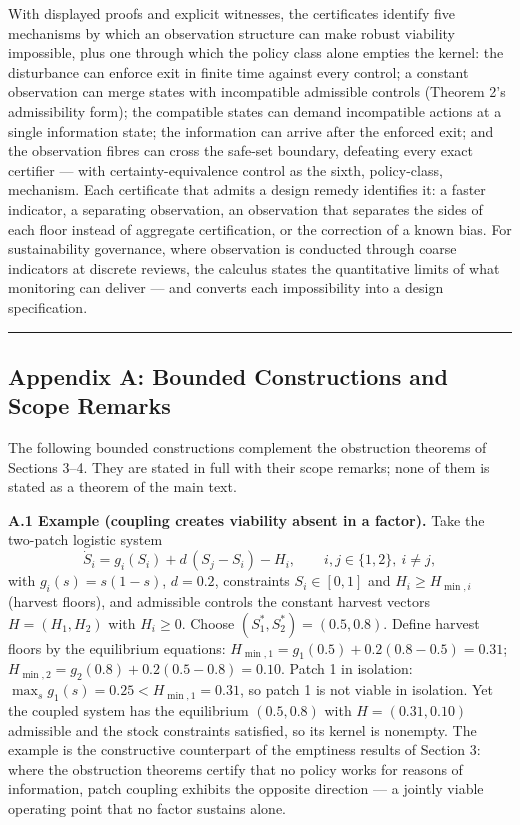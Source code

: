\documentclass[11pt]{article}
\begin{document}
With displayed proofs and explicit witnesses, the certificates identify
five mechanisms by which an observation structure can make robust
viability impossible, plus one through which the policy class alone
empties the kernel: the disturbance can enforce exit in finite time
against every control; a constant observation can merge states with
incompatible admissible controls (Theorem 2's admissibility form);
the compatible states can demand incompatible actions at a single
information state; the information can arrive after the enforced exit;
and the observation fibres can cross the safe-set boundary, defeating
every exact certifier --- with certainty-equivalence control as the
sixth, policy-class, mechanism. Each certificate that admits a design
remedy identifies it: a faster indicator, a separating observation, an
observation that separates the sides of each floor instead of aggregate
certification, or the correction of a known bias. For sustainability
governance, where observation is conducted through coarse indicators at
discrete reviews, the calculus states the quantitative limits of what
monitoring can deliver --- and converts each impossibility into a design
specification.

\begin{center}\rule{0.5\linewidth}{0.5pt}\end{center}

\subsection{Appendix A: Bounded Constructions and Scope
Remarks}\label{appendix-a-bounded-constructions-and-scope-remarks}

The following bounded constructions complement the obstruction theorems
of Sections 3--4. They are stated in full with their scope remarks; none of them is stated as a theorem of the main text.

\textbf{A.1 Example (coupling creates viability absent in a factor).}
Take the two-patch logistic system
\[\dot S_i = g_i(S_i) + d\,(S_j - S_i) - H_i, \qquad i, j \in \{1,2\},\ i \ne j,\]
with \(g_i(s) = s(1-s)\), \(d = 0.2\), constraints \(S_i \in [0,1]\) and
\(H_i \ge H_{\min,i}\) (harvest floors), and admissible controls the
constant harvest vectors \(H = (H_1, H_2)\) with \(H_i \ge 0\). Choose
\((S_1^*, S_2^*) = (0.5, 0.8)\). Define harvest floors by the
equilibrium equations:
\(H_{\min,1} = g_1(0.5) + 0.2(0.8 - 0.5) = 0.31\);
\(H_{\min,2} = g_2(0.8) + 0.2(0.5 - 0.8) = 0.10\). Patch 1 in isolation:
\(\max_s g_1(s) = 0.25 < H_{\min,1} = 0.31\), so patch 1 is not viable
in isolation. Yet the coupled system has the equilibrium \((0.5, 0.8)\)
with \(H = (0.31, 0.10)\) admissible and the stock constraints
satisfied, so its kernel is nonempty. The example is the constructive
counterpart of the emptiness results of Section 3: where the obstruction
theorems certify that no policy works for reasons of information, patch
coupling exhibits the opposite direction --- a jointly viable operating
point that no factor sustains alone.
\end{document}
